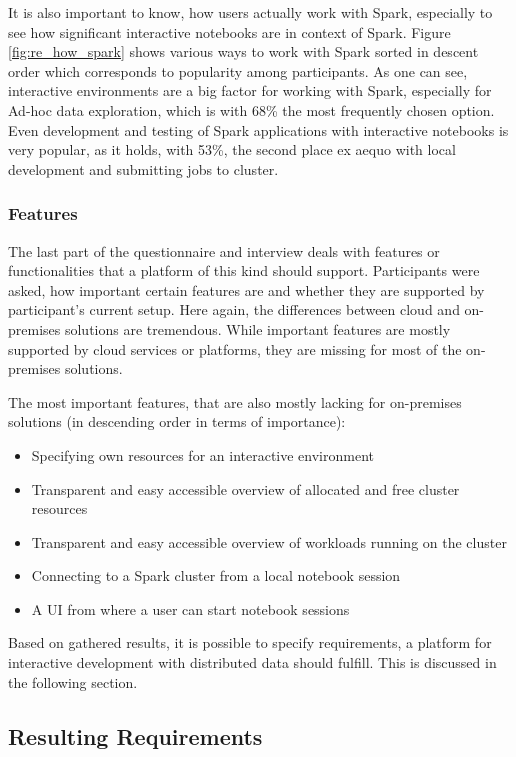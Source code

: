 \documentclass[a4paper,twoside]{article}
\begin{document}
It is also important to know, how users actually work with Spark, especially to see how significant interactive notebooks are in context of Spark. Figure \ref{fig:re_how_spark} shows various ways to work with Spark sorted in descent order which corresponds to popularity among participants. As one can see, interactive environments are a big factor for working with Spark, especially for Ad-hoc data exploration, which is with 68\% the most frequently chosen option. Even development and testing of Spark applications with interactive notebooks is very popular, as it holds, with 53\%, the second place ex aequo with local development and submitting jobs to cluster. 

\subsubsection{Features}

The last part of the questionnaire and interview deals with features or functionalities that a platform of this kind should support. Participants were asked, how important certain features are and whether they are supported by participant's current setup. Here again, the differences between cloud and on-premises solutions are tremendous. While important features are mostly supported by cloud services or platforms, they are missing for most of the on-premises solutions.

The most important features, that are also mostly lacking for on-premises solutions (in descending order in terms of importance):

\begin{itemize}
    \item Specifying own resources for an interactive environment
    \item Transparent and easy accessible overview of allocated and free cluster resources
    \item Transparent and easy accessible overview of workloads running on the cluster
    \item Connecting to a Spark cluster from a local notebook session
    \item A UI from where a user can start notebook sessions
\end{itemize}

Based on gathered results, it is possible to specify requirements, a platform for interactive development with distributed data should fulfill. This is discussed in the following section.

\subsection{Resulting Requirements}
\end{document}
